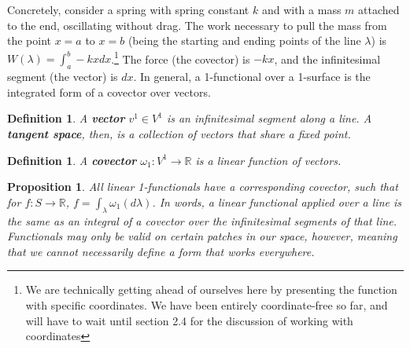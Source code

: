 \documentclass{book}
\newtheorem{defn}[equation]{Definition}
\newtheorem{prop}[equation]{Proposition}
\begin{document}
Concretely, consider a spring with spring constant $k$ and with a mass $m$ attached to the end, oscillating without drag. The work necessary to pull the mass from the point $x = a$ to $x = b$ (being the starting and ending points of the line $\lambda$) is $W(\lambda) = \int_a^b -kx dx$.\footnote{We are technically getting ahead of ourselves here by presenting the function with specific coordinates. We have been entirely coordinate-free so far, and will have to wait until section 2.4 for the discussion of working with coordinates} The force (the covector) is $-kx$, and the infinitesimal segment (the vector) is $dx$. In general, a 1-functional over a 1-surface is the integrated form of a covector over vectors.


\begin{defn}
	A \textbf{vector} $v^1 \in V^1$ is an infinitesimal segment along a line. A \textbf{tangent space}, then, is a collection of vectors that share a fixed point. 
\end{defn}


\begin{defn}
	A \textbf{covector} $\omega_1 : V^1 \to \mathbb{R}$ is a linear function of vectors. 
\end{defn}





\begin{prop}
	All linear 1-functionals have a corresponding covector, such that for $f : S \to \mathbb{R}$, $f = \int_{\lambda} \omega_1(d\lambda)$. In words, a linear functional applied over a line is the same as an integral of a covector over the infinitesimal segments of that line. Functionals may only be valid on certain patches in our space, however, meaning that we cannot necessarily define a form that works everywhere. 
\end{prop}
\end{document}
